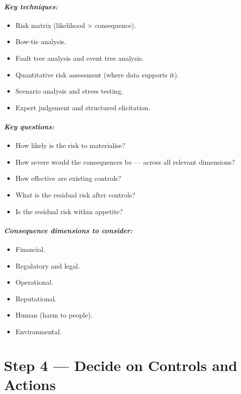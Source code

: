 \paragraph{\textit{Key techniques:}}
\begin{itemize}
  \item{Risk matrix (likelihood × consequence).}
  \item{Bow-tie analysis.}
  \item{Fault tree analysis and event tree analysis.}
  \item{Quantitative risk assessment (where data supports it).}
  \item{Scenario analysis and stress testing.}
  \item{Expert judgement and structured elicitation.}
\end{itemize}

\paragraph{\textit{Key questions:}}
\begin{itemize}
  \item{How likely is the risk to materialise?}
  \item{How severe would the consequences be — across all relevant dimensions?}
  \item{How effective are existing controls?}
  \item{What is the residual risk after controls?}
  \item{Is the residual risk within appetite?}
\end{itemize}

\paragraph{\textit{Consequence dimensions to consider:}}
\begin{itemize}
  \item{Financial.}
  \item{Regulatory and legal.}
  \item{Operational.}
  \item{Reputational.}
  \item{Human (harm to people).}
  \item{Environmental.}
\end{itemize}

\section*{Step 4 — Decide on Controls and Actions}
